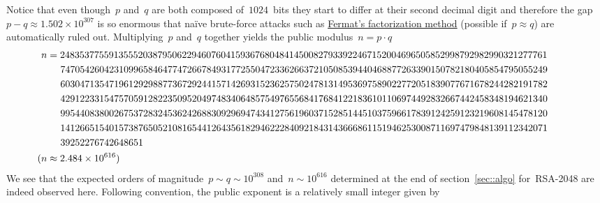 \documentclass{article}
\begin{document}
\noindent Notice that even though~$p$ and~$q$ are both composed of~$1024$~bits they start to differ at their second decimal digit and therefore the gap~$p - q \approx 1.502 \times 10^{307}$ is so enormous that na\"ive brute-force attacks such as \href{https://en.wikipedia.org/wiki/Fermat\%27s_factorization_method}{Fermat's factorization method} (possible if~$p \approx q$) are automatically ruled out.  Multiplying~$p$ and~$q$ together yields the public modulus~$n = p \cdot q$
\begin{align*}
\hspace*{-1cm} n &= 2483537755913555203879506229460760415936768048414500827933922467152004696505852998792982990321277761 \\
\hspace*{-1cm} & \hspace{0.48cm} 7470542604231099658464774726678493177255047233626637210508539440468877263390150782180405854795055249  \\
\hspace*{-1cm} & \hspace{0.48cm} 6030471354719612929887736729244157142693152362575024781314953697589022772051839077671678244282191782 \\
\hspace*{-1cm} & \hspace{0.48cm} 4291223315475705912822350952049748340648575497655684176841221836101106974492832667442458348194621340 \\
\hspace*{-1cm} & \hspace{0.48cm} 9954408380026753728324536242688309296947434127561960371528514451037596617839124259123219608145478120 \\
\hspace*{-1cm} & \hspace{0.48cm} 1412665154015738765052108165441264356182946222840921843143666861151946253008711697479848139112342071 \\
\hspace*{-1cm} & \hspace{0.48cm} 39252276742648651 \\
\hspace*{-1cm} (n&\approx 2.484 \times 10^{616})
\end{align*}
We see that the expected orders of magnitude~$p \sim q \sim 10^{308}$ and~$n\sim 10^{616}$ determined at the end of section~\ref{sec::algo} for~RSA-2048 are indeed observed here.  Following convention, the public exponent is a relatively small integer given by
\end{document}
